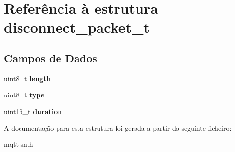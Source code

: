\hypertarget{structdisconnect__packet__t}{\section{Referência à estrutura disconnect\+\_\+packet\+\_\+t}
\label{structdisconnect__packet__t}
}
\subsection*{Campos de Dados}
\begin{DoxyCompactItemize}
\item 
\hypertarget{structdisconnect__packet__t_ab2b3adeb2a67e656ff030b56727fd0ac}{uint8\+\_\+t {\bfseries length}}\label{structdisconnect__packet__t_ab2b3adeb2a67e656ff030b56727fd0ac}

\item 
\hypertarget{structdisconnect__packet__t_a1d127017fb298b889f4ba24752d08b8e}{uint8\+\_\+t {\bfseries type}}\label{structdisconnect__packet__t_a1d127017fb298b889f4ba24752d08b8e}

\item 
\hypertarget{structdisconnect__packet__t_a5b14ef3e3e30242faa9bbef961493044}{uint16\+\_\+t {\bfseries duration}}\label{structdisconnect__packet__t_a5b14ef3e3e30242faa9bbef961493044}

\end{DoxyCompactItemize}


A documentação para esta estrutura foi gerada a partir do seguinte ficheiro\+:\begin{DoxyCompactItemize}
\item 
mqtt-\/sn.\+h\end{DoxyCompactItemize}
